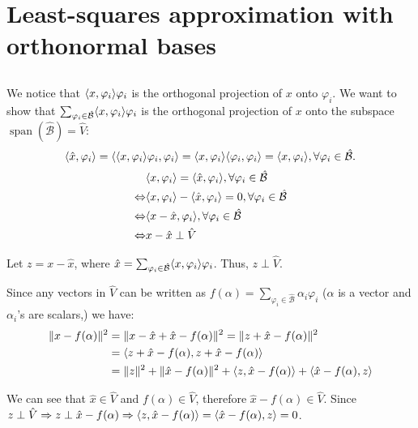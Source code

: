 \section{Least-squares approximation with orthonormal bases}\label{sec:part3}

\subsection{}
We notice that $\langle x, \varphi_i \rangle\varphi_i$ is the orthogonal projection of $x$ onto $\varphi_i$. We want to show that $\sum_{\varphi_i \in \hat{\mathcal{B}}} \langle x, \varphi_i \rangle\varphi_i$ is the orthogonal projection of $x$ onto the subspace $\operatorname{span}(\hat{\mathcal{B}}) = \hat{V}$:
\[\langle \hat{x}, \varphi_i \rangle = \langle \langle x, \varphi_i \rangle\varphi_i, \varphi_i \rangle = \langle x, \varphi_i \rangle \langle \varphi_i, \varphi_i \rangle = \langle x, \varphi_i \rangle, \forall \varphi_i \in \hat{\mathcal{B}}.\]
\begin{align*}
	&\langle x, \varphi_i \rangle = \langle \hat{x}, \varphi_i \rangle, \forall \varphi_i \in \hat{\mathcal{B}}\\
	\Leftrightarrow &\langle x, \varphi_i \rangle - \langle \hat{x}, \varphi_i \rangle = 0, \forall \varphi_i \in \hat{\mathcal{B}}\\
	\Leftrightarrow &\langle x - \hat{x}, \varphi_i \rangle, \forall \varphi_i \in \hat{\mathcal{B}}\\
	\Leftrightarrow &x - \hat{x} \perp \hat{V}
\end{align*}

Let $z = x - \hat{x}$, where $\hat{x} = \sum_{\varphi_i \in \hat{\mathcal{B}}} \langle x, \varphi_i \rangle\varphi_i$. Thus, $z \perp \hat{V}$.

Since any vectors in $\hat{V}$ can be written as $f(\alpha) = \sum_{\varphi_i \in \hat{\mathcal{B}}} \alpha_i \varphi_i$ ($\alpha$ is a vector and $\alpha_i$'s are scalars,) we have:
\begin{align*}
	\lVert x - f(\alpha) \rVert^2 &= \lVert x - \hat{x} + \hat{x} - f(\alpha) \rVert^2 = \lVert z + \hat{x}- f(\alpha) \rVert^2 \\
	&= \langle z+\hat{x}-f(\alpha), z+\hat{x}-f(\alpha) \rangle \\
	&= \lVert z \rVert^2 + \lVert \hat{x} - f(\alpha) \rVert^2 + \langle z, \hat{x}-f(\alpha) \rangle + \langle \hat{x}-f(\alpha), z \rangle
\end{align*}

We can see that $\hat{x} \in \hat{V}$ and $f(\alpha) \in \hat{V}$, therefore $\hat{x}-f(\alpha) \in \hat{V}$. Since $z \perp \hat{V} \Rightarrow z \perp \hat{x} - f(\alpha) \Rightarrow \langle z, \hat{x}-f(\alpha) \rangle = \langle \hat{x}-f(\alpha), z \rangle = 0$.

